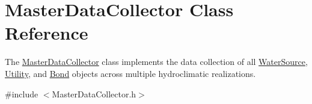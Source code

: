 \hypertarget{classMasterDataCollector}{}\section{Master\+Data\+Collector Class Reference}
\label{classMasterDataCollector}


The {\ttfamily \mbox{\hyperlink{classMasterDataCollector}{Master\+Data\+Collector}}} class implements the data collection of all \mbox{\hyperlink{classWaterSource}{Water\+Source}}, \mbox{\hyperlink{classUtility}{Utility}}, and \mbox{\hyperlink{classBond}{Bond}} objects across multiple hydroclimatic realizations.  




{\ttfamily \#include $<$Master\+Data\+Collector.\+h$>$}

